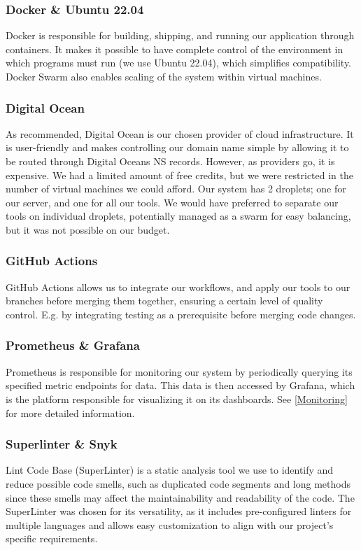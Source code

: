 \subsubsection{Docker \& Ubuntu 22.04}
Docker is responsible for building, shipping, and running our application through containers. It makes it possible to have complete control of the environment in which programs must run (we use Ubuntu 22.04), which simplifies compatibility. Docker Swarm also enables scaling of the system within virtual machines.

\subsubsection{Digital Ocean}
As recommended, Digital Ocean is our chosen provider of cloud infrastructure. It is user-friendly and makes controlling our domain name simple by allowing it to be routed through Digital Oceans NS records. However, as providers go, it is expensive. We had a limited amount of free credits, but we were restricted in the number of virtual machines we could afford. Our system has 2 droplets; one for our server, and one for all our tools. We would have preferred to separate our tools on individual droplets, potentially managed as a swarm for easy balancing, but it was not possible on our budget. 

\subsubsection{GitHub Actions}
GitHub Actions allows us to integrate our workflows, and apply our tools to our branches before merging them together, ensuring a certain level of quality control. E.g. by integrating testing as a prerequisite before merging code changes.

\subsubsection{Prometheus \& Grafana}
Prometheus is responsible for monitoring our system by periodically querying its specified metric endpoints for data. This data is then accessed by Grafana, which is the platform responsible for visualizing it on its dashboards. See \ref{Monitoring} for more detailed information.

\subsubsection{Superlinter \& Snyk}
Lint Code Base (SuperLinter) is a static analysis tool we use to identify and reduce possible code smells, such as duplicated code segments and long methods since these smells may affect the maintainability and readability of the code. The SuperLinter was chosen for its versatility, as it includes pre-configured linters for multiple languages and allows easy customization to align with our project's specific requirements.

